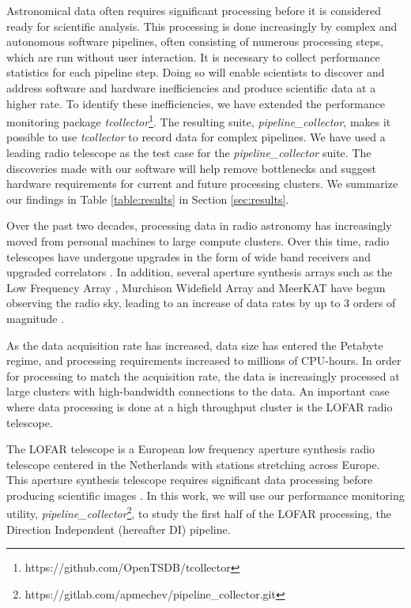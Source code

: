 Astronomical data often requires significant processing before it is considered ready for scientific analysis. This processing is done increasingly by complex and autonomous software pipelines, often consisting of numerous processing steps, which are run without user interaction. It is necessary to collect performance statistics for each pipeline step. Doing so will enable scientists to discover and address software and hardware inefficiencies and produce scientific data at a higher rate. To identify these inefficiencies, we have extended the performance monitoring package \textit{tcollector}\footnote{https://github.com/OpenTSDB/tcollector}\citep{tcollector}. The resulting suite, \textit{pipeline\_collector}, makes it possible to use \textit{tcollector} to record data for complex pipelines. We have used a leading radio telescope as the test case for the \textit{pipeline\_collector} suite. The discoveries made with our software will help remove bottlenecks and suggest hardware requirements for current and future processing clusters. We summarize our findings in Table \ref{table:results} in Section \ref{sec:results}.

Over the past two decades, processing data in radio astronomy has increasingly moved from personal machines to large compute clusters. Over this time, radio telescopes have undergone upgrades in the form of wide band receivers and upgraded correlators \citep{lofarcobalt,gmrt_upgrade}. In addition, several aperture synthesis arrays such as the Low Frequency Array \citep[LOFAR,][]{LOFAR}, Murchison Widefield Array \citep[MWA][]{MWA,mwa2} and MeerKAT \citep{meerkat} have begun observing the radio sky, leading to an increase of data rates by up to 3 orders of magnitude \citep{mwa_data_size,meerkat_size}.

As the data acquisition rate has increased, data size has entered the Petabyte regime, and processing requirements increased to millions of CPU-hours. In order for processing to match the acquisition rate, the data is increasingly processed at large clusters with high-bandwidth connections to the data. An important case where data processing is done at a high throughput cluster is the LOFAR radio telescope.

The LOFAR telescope is a European low frequency aperture synthesis radio telescope centered in the Netherlands with stations stretching across Europe. This aperture synthesis telescope requires significant data processing before producing scientific images \citep{lofar_prefactor,Wendy_bootes,tassesmirnov,oonk_2014}. In this work, we will use our performance monitoring utility, \textit{pipeline\_collector}\footnote{https://gitlab.com/apmechev/pipeline\_collector.git}, to study the first half of the LOFAR processing, the Direction Independent (hereafter  DI) pipeline. 

